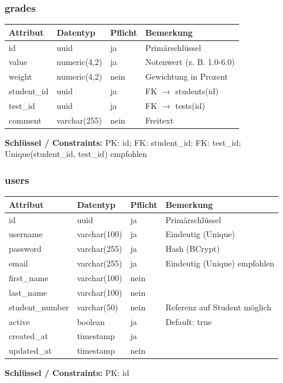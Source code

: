 \documentclass[12pt,a4paper]{article}
\begin{document}
    \subsubsection{grades}
    \begin{longtable}{|L{4cm}|L{3cm}|L{3cm}|L{4cm}|}
        \hline
        \textbf{Attribut} & \textbf{Datentyp} & \textbf{Pflicht} & \textbf{Bemerkung} \\ \hline
        id & uuid & ja & Primärschlüssel \\ \hline
        value & numeric(4,2) & ja & Notenwert (z. B. 1.0-6.0) \\ \hline
        weight & numeric(4,2) & nein & Gewichtung in Prozent \\ \hline
        student\_id & uuid & ja & FK $\rightarrow$ students(id) \\ \hline
        test\_id & uuid & ja & FK $\rightarrow$ tests(id) \\ \hline
        comment & varchar(255) & nein & Freitext \\ \hline
    \end{longtable}
    \textbf{Schlüssel / Constraints:} PK: id; FK: student\_id; FK: test\_id; Unique(student\_id, test\_id) empfohlen

    \subsubsection{users}
    \begin{longtable}{|L{4cm}|L{3cm}|L{3cm}|L{4cm}|}
        \hline
        \textbf{Attribut} & \textbf{Datentyp} & \textbf{Pflicht} & \textbf{Bemerkung} \\ \hline
        id & uuid & ja & Primärschlüssel \\ \hline
        username & varchar(100) & ja & Eindeutig (Unique) \\ \hline
        password & varchar(255) & ja & Hash (BCrypt) \\ \hline
        email & varchar(255) & ja & Eindeutig (Unique) empfohlen \\ \hline
        first\_name & varchar(100) & nein &  \\ \hline
        last\_name & varchar(100) & nein &  \\ \hline
        student\_number & varchar(50) & nein & Referenz auf Student möglich \\ \hline
        active & boolean & ja & Default: true \\ \hline
        created\_at & timestamp & ja &  \\ \hline
        updated\_at & timestamp & nein &  \\ \hline
    \end{longtable}
    \textbf{Schlüssel / Constraints:} PK: id
\end{document}
